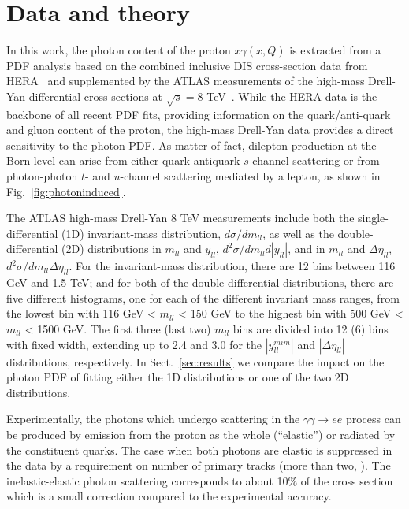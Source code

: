 \section{Data and theory}
\label{sec:theory}

In this work, the photon content of the proton $x\gamma(x,Q)$ is
extracted from a PDF analysis based on the combined inclusive DIS
cross-section data from HERA~\cite{Abramowicz:2015mha} and
supplemented by the ATLAS measurements of the high-mass Drell-Yan
differential cross sections at $\sqrt{s}=8$ TeV~\cite{Aad:2016zzw}.
%
While the HERA data is the backbone of all recent PDF fits, providing
information on the quark/anti-quark and gluon content of the proton,
the high-mass Drell-Yan data provides a direct sensitivity to the
photon PDF.
%
As matter of fact, dilepton production at the Born level can arise
from either quark-antiquark $s$-channel scattering or from
photon-photon $t$- and $u$-channel scattering mediated by a lepton, as
shown in Fig.~\ref{fig:photoninduced}.

The ATLAS high-mass Drell-Yan 8 TeV measurements include both the
single-differential (1D) invariant-mass distribution,
$d\sigma/dm_{ll}$, as well as the double-differential (2D)
distributions in $m_{ll}$ and $y_{ll}$,
$d^{2}\sigma/dm_{ll}d|y_{ll}|$, and in $m_{ll}$ and $\Delta\eta_{ll}$,
$d^{2}\sigma/dm_{ll}\Delta\eta_{ll}$.
%
For the invariant-mass distribution, there are 12 bins between 116 GeV
and 1.5 TeV; and for both of the double-differential distributions,
there are five different histograms, one for each of the different
invariant mass ranges, from the lowest bin with 116 GeV < $m_{ll}$ <
150 GeV to the highest bin with 500 GeV < $m_{ll}$ < 1500 GeV.
The first three (last two) $m_{ll}$ bins are divided into 12 (6) bins
with fixed width, extending up to 2.4 and 3.0 for the $|y_{ll}^{mim}|$
and $|\Delta\eta_{ll}|$ distributions, respectively.
%
In Sect.~\ref{sec:results} we compare the impact on the photon PDF of
fitting either the 1D distributions or one of the two 2D
distributions.

Experimentally, the photons which undergo scattering in the
$\gamma\gamma \to ee$  process can be produced by emission from the
proton as the whole (``elastic'') or radiated by the constituent quarks.
The case when both photons are elastic is suppressed in the data by a
requirement on number of primary tracks (more than two, \cite{Aad:2016zzw}).  
The inelastic-elastic photon scattering corresponds to about 10\% of the
cross section which is a small correction compared to the experimental
accuracy.

